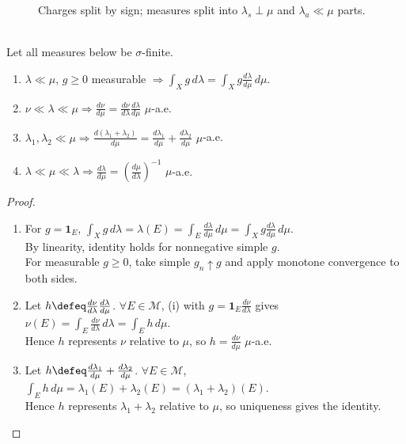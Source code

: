 \begin{figure}[H]
  \centering
  
  \caption{Charges split by sign; measures split into $\lambda_s\perp\mu$ and $\lambda_a\ll\mu$ parts.}
  \label{fig:measure-decomposition-schematic}
\end{figure}

\begin{proposition} \label{prop:radon-nikodym-change-of-measure-calculus} \\
Let all measures below be $\sigma$-finite.
\begin{enumerate}[label=(\roman*)]
\setlength{\itemsep}{0pt}
\item $\lambda\ll\mu$, $g\geq0$ measurable $\Rightarrow\int_Xg\,d\lambda=\int_Xg\frac{d\lambda}{d\mu}\,d\mu$.
\item $\nu\ll\lambda\ll\mu\Rightarrow\frac{d\nu}{d\mu}=\frac{d\nu}{d\lambda}\frac{d\lambda}{d\mu}$ $\mu$-a.e.
\item $\lambda_1,\lambda_2\ll\mu\Rightarrow\frac{d(\lambda_1+\lambda_2)}{d\mu}=\frac{d\lambda_1}{d\mu}+\frac{d\lambda_2}{d\mu}$ $\mu$-a.e.
\item $\lambda\ll\mu\ll\lambda\Rightarrow\frac{d\lambda}{d\mu}=\left(\frac{d\mu}{d\lambda}\right)^{-1}$ $\mu$-a.e.
\end{enumerate}
\begin{proof}
\begin{enumerate}[label=(\roman*)]
\setlength{\itemsep}{0pt}
\item For $g=\mathbf{1}_E$, $\int_Xg\,d\lambda=\lambda(E)=\int_E\frac{d\lambda}{d\mu}\,d\mu=\int_Xg\frac{d\lambda}{d\mu}\,d\mu$.\\
By linearity, identity holds for nonnegative simple $g$.\\
For measurable $g\geq0$, take simple $g_n\uparrow g$ and apply monotone convergence to both sides.
\item Let $h\defeq\frac{d\nu}{d\lambda}\frac{d\lambda}{d\mu}$. $\forall E\in\mathcal{M}$, (i) with $g=\mathbf{1}_E\frac{d\nu}{d\lambda}$ gives $\nu(E)=\int_E\frac{d\nu}{d\lambda}\,d\lambda=\int_Eh\,d\mu$.\\
Hence $h$ represents $\nu$ relative to $\mu$, so $h=\frac{d\nu}{d\mu}$ $\mu$-a.e.
\item Let $h\defeq\frac{d\lambda_1}{d\mu}+\frac{d\lambda_2}{d\mu}$. $\forall E\in\mathcal{M}$, $\int_Eh\,d\mu=\lambda_1(E)+\lambda_2(E)=(\lambda_1+\lambda_2)(E)$.\\
Hence $h$ represents $\lambda_1+\lambda_2$ relative to $\mu$, so uniqueness gives the identity.

\end{enumerate}
\end{proof}
\end{proposition}
